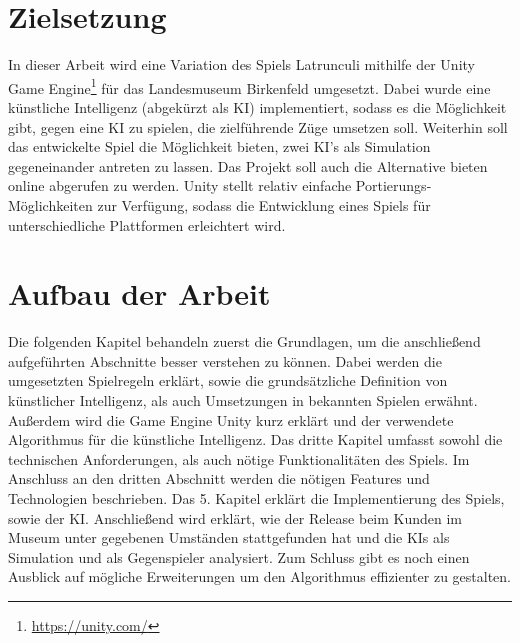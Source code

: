 \section{Zielsetzung}
\label{ch:Einleitung:sec:Zielsetzung}
In dieser Arbeit wird eine Variation des Spiels Latrunculi mithilfe der Unity Game Engine\footnote{\url{https://unity.com/}} für das Landesmuseum Birkenfeld umgesetzt. Dabei wurde eine künstliche Intelligenz (abgekürzt als KI) implementiert, sodass es die Möglichkeit gibt, gegen eine KI zu spielen, die zielführende Züge umsetzen soll. Weiterhin soll das entwickelte Spiel die Möglichkeit bieten, zwei KI's als Simulation gegeneinander antreten zu lassen. Das Projekt soll auch die Alternative bieten online abgerufen zu werden. Unity stellt relativ einfache Portierungs-Möglichkeiten zur Verfügung, sodass die Entwicklung eines Spiels für unterschiedliche Plattformen erleichtert wird.




\section{Aufbau der Arbeit}
\label{ch:Einleitung:sec:Gliederung}


Die folgenden Kapitel behandeln zuerst die Grundlagen, um die anschließend aufgeführten Abschnitte besser verstehen zu können. Dabei werden die umgesetzten Spielregeln erklärt, sowie die grundsätzliche Definition von künstlicher Intelligenz, als auch Umsetzungen in bekannten Spielen erwähnt. Außerdem wird die Game Engine Unity kurz erklärt und der verwendete Algorithmus für die künstliche Intelligenz. Das dritte Kapitel umfasst sowohl die technischen Anforderungen, als auch nötige Funktionalitäten des Spiels.
Im Anschluss an den dritten Abschnitt werden die nötigen Features und Technologien beschrieben.
Das 5. Kapitel erklärt die Implementierung des Spiels, sowie der KI. Anschließend wird erklärt, wie der Release beim Kunden im Museum unter gegebenen Umständen stattgefunden hat und die KIs als Simulation und als Gegenspieler analysiert. Zum Schluss gibt es noch einen Ausblick auf mögliche Erweiterungen um den Algorithmus effizienter zu gestalten.

